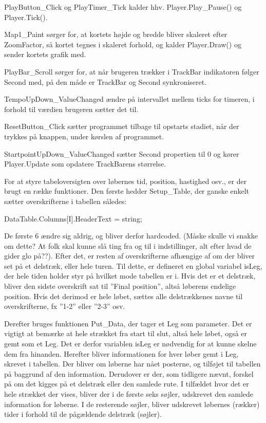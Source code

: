 PlayButton\_Click og PlayTimer\_Tick kalder hhv. Player.Play\_Pause() og Player.Tick().

Map1\_Paint sørger for, at kortets højde og bredde bliver skaleret efter ZoomFactor, så kortet tegnes i skaleret forhold, og kalder Player.Draw() og sender kortets grafik med.

PlayBar\_Scroll sørger for, at når brugeren trækker i TrackBar indikatoren følger Second med, på den måde er TrackBar og Second synkroniseret.

TempoUpDown\_ValueChanged ændre på intervallet mellem ticks for timeren, i forhold til værdien brugeren sætter det til. 

ResetButton\_Click sætter programmet tilbage til opstarts stadiet, når der trykkes på knappen, under kørslen af programmet. 

StartpointUpDown\_ValueChanged sætter Second propertien til 0 og kører Player.Update som opdatere TrackBarens størrelse.

For at styre tabeloversigten over løbernes tid, position, hastighed osv., er der brugt en række funktioner. 
Den første hedder Setup\_Table, der ganske enkelt sætter overskrifterne i tabellen således:

DataTable.Columns[I].HeaderText = string;

De første 6 ændre sig aldrig, og bliver derfor hardcoded. (Måske skulle vi snakke om dette? At folk skal kunne slå ting fra og til i indstillinger, alt efter hvad de gider glo på??). Efter det, er resten af overskrifterne afhængige af om der bliver set på et delstræk, eller hele turen.  Til dette, er defineret en global variabel isLeg, der hele tiden holder styr på hvilket mode tabellen er i. Hvis det er et delstræk, bliver den sidste overskrift sat til ”Final position”, altså løberens endelige position. Hvis det derimod er hele løbet, sættes alle delstrækkenes navne til overskrifterne, fx ”1-2” eller ”2-3” osv. 

Derefter bruges funktionen Put\_Data, der tager et Leg som parameter. Det er vigtigt at bemærke at hele strækket fra start til slut, altså hele løbet, også er gemt som et Leg. Det er derfor variablen isLeg er nødvendig for at kunne skelne dem fra hinanden. Herefter bliver informationen for hver løber gemt i Leg, skrevet i tabellen. Der bliver om løberne har nået posterne, og tilføjet til tabellen på baggrund af den information. Derudover er der, som tidligere nævnt, forskel på om det kigges på et delstræk eller den samlede rute. I tilfældet hvor det er hele strækket der vises, bliver der i de første seks søjler, udskrevet den samlede information for løberne. I de resterende søjler, bliver udskrevet løbernes (rækker) tider i forhold til de pågældende delstræk (søjler).

